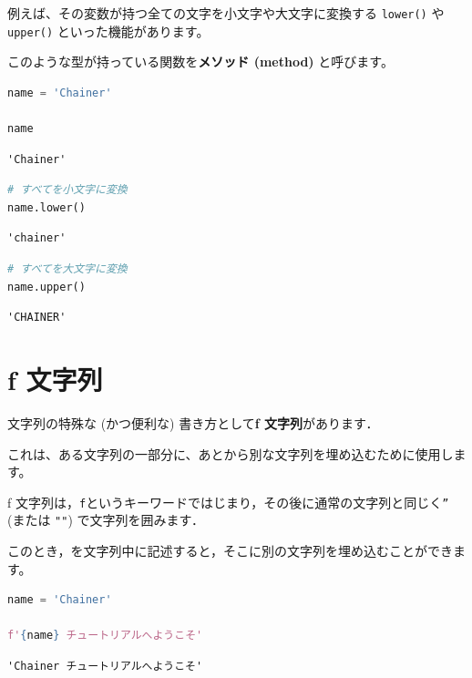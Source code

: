 例えば、その変数が持つ全ての文字を小文字や大文字に変換する \texttt{lower()} や \texttt{upper()} といった機能があります。

このような型が持っている関数を\textbf{メソッド (method)} と呼びます。


\begin{lstlisting}[style=codecell,language=Python]
name = 'Chainer'

name
\end{lstlisting}

\begin{lstlisting}[style=outputcell]
'Chainer'
\end{lstlisting}

\begin{lstlisting}[style=codecell,language=Python]
# すべてを小文字に変換
name.lower()
\end{lstlisting}

\begin{lstlisting}[style=outputcell]
'chainer'
\end{lstlisting}

\begin{lstlisting}[style=codecell,language=Python]
# すべてを大文字に変換
name.upper()
\end{lstlisting}

\begin{lstlisting}[style=outputcell]
'CHAINER'
\end{lstlisting}

\section{f 文字列}

文字列の特殊な (かつ便利な) 書き方として\textbf{f 文字列}があります．

これは、ある文字列の一部分に、あとから別な文字列を埋め込むために使用します。

f 文字列は，\texttt{f}というキーワードではじまり，その後に通常の文字列と同じく\texttt{''} (または \texttt{""}) で文字列を囲みます．

このとき，\texttt{{}}を文字列中に記述すると，そこに別の文字列を埋め込むことができます。


\begin{lstlisting}[style=codecell,language=Python]
name = 'Chainer'

f'{name} チュートリアルへようこそ'
\end{lstlisting}

\begin{lstlisting}[style=outputcell]
'Chainer チュートリアルへようこそ'
\end{lstlisting}

